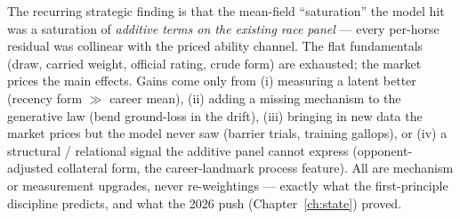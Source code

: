 The recurring strategic finding is that the mean-field ``saturation'' the model hit was a
saturation of \emph{additive terms on the existing race panel} --- every per-horse residual was
collinear with the priced ability channel. The flat fundamentals (draw, carried weight, official
rating, crude form) are exhausted; the market prices the main effects. Gains come only from
(i) measuring a latent better (recency form $\gg$ career mean), (ii) adding a missing mechanism to
the generative law (bend ground-loss in the drift), (iii) bringing in new data the market prices but
the model never saw (barrier trials, training gallops), or (iv) a structural / relational signal the
additive panel cannot express (opponent-adjusted collateral form, the career-landmark process
feature). All are mechanism or measurement upgrades, never re-weightings --- exactly what the
first-principle discipline predicts, and what the 2026 push (Chapter~\ref{ch:state}) proved.
